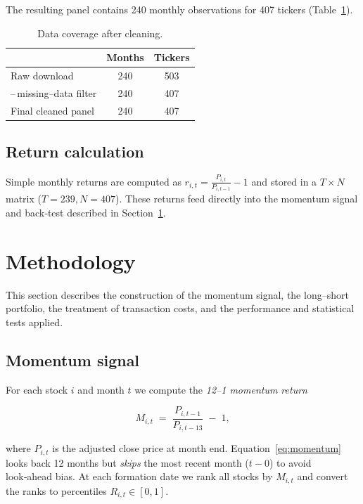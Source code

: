 \documentclass[11pt]{article}
\begin{document}
The resulting panel contains 240 monthly observations for 407 tickers (Table~\ref{tab:coverage}).

\begin{table}[h!]
  \centering
  \begin{tabular}{lcc}
    \toprule
    & \textbf{Months} & \textbf{Tickers} \\
    \midrule
    Raw download                 & 240 & 503 \\
    \quad--\,missing--data filter & 240 & 407 \\
    Final cleaned panel          & 240 & 407 \\
    \bottomrule
  \end{tabular}
  \caption{Data coverage after cleaning.}
  \label{tab:coverage}
\end{table}

\subsection{Return calculation}

Simple monthly returns are computed as $r_{i,t} = \frac{P_{i,t}}{P_{i,t-1}}-1$ and stored in a $T \times N$ matrix ($T{=}239, N{=}407$).  
These returns feed directly into the momentum signal and back‑test described in Section~\ref{sec:method}.

\section{Methodology} \label{sec:method}
This section describes the construction of the momentum signal, the long–short portfolio, the treatment of transaction costs, and the performance and statistical tests applied.

\subsection{Momentum signal}

For each stock \(i\) and month \(t\) we compute the \emph{12--1 momentum return}

\begin{equation} \label{eq:momentum}
M_{i,t} \;=\; \frac{P_{i,t-1}}{P_{i,t-13}} \;-\; 1,
\end{equation}

where \(P_{i,t}\) is the adjusted close price at month end.  
Equation~\eqref{eq:momentum} looks back 12 months but \emph{skips} the most recent month (\(t-0\)) to avoid look‑ahead bias.  
At each formation date we rank all stocks by \(M_{i,t}\) and convert the ranks to percentiles \(R_{i,t}\in[0,1]\).
\end{document}
